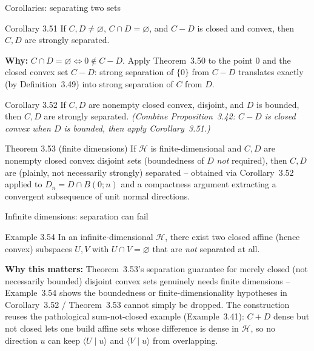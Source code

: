 \documentclass[aspectratio=169,10pt]{beamer}
\newcommand{\Hil}{\mathcal{H}}
\newcommand{\ip}[2]{\langle #1 \mid #2 \rangle}
\begin{document}
\begin{frame}{Corollaries: separating two sets}
  \begin{block}{Corollary 3.51}
    If $C,D\ne\varnothing$, $C\cap D=\varnothing$, and $C-D$ is closed and
    convex, then $C,D$ are strongly separated.
  \end{block}
  \textbf{Why:} $C\cap D=\varnothing \iff 0\notin C-D$. Apply
  Theorem~3.50 to the point $0$ and the closed convex set $C-D$: strong
  separation of $\{0\}$ from $C-D$ translates exactly (by Definition~3.49)
  into strong separation of $C$ from $D$.

  \begin{block}{Corollary 3.52}
    If $C,D$ are nonempty closed convex, disjoint, and $D$ is bounded, then
    $C,D$ are strongly separated. \emph{(Combine Proposition~3.42: $C-D$ is
    closed convex when $D$ is bounded, then apply Corollary~3.51.)}
  \end{block}

  \begin{block}{Theorem 3.53 (finite dimensions)}
    If $\Hil$ is finite-dimensional and $C,D$ are nonempty closed convex
    disjoint sets (boundedness of $D$ \emph{not} required), then $C,D$ are
    (plainly, not necessarily strongly) separated -- obtained via
    Corollary~3.52 applied to $D_n = D\cap B(0;n)$ and a compactness
    argument extracting a convergent subsequence of unit normal directions.
  \end{block}
\end{frame}

\begin{frame}{Infinite dimensions: separation can fail}
  \begin{block}{Example 3.54}
    In an infinite-dimensional $\Hil$, there exist two closed affine
    (hence convex) subspaces $U,V$ with $U\cap V=\varnothing$ that are
    \emph{not} separated at all.
  \end{block}
  \textbf{Why this matters:} Theorem~3.53's separation guarantee for merely
  closed (not necessarily bounded) disjoint convex sets genuinely needs
  finite dimensions -- Example~3.54 shows the boundedness or
  finite-dimensionality hypotheses in Corollary~3.52 / Theorem~3.53 cannot
  simply be dropped. The construction reuses the pathological sum-not-closed
  example (Example~3.41): $C+D$ dense but not closed lets one build affine
  sets whose difference is dense in $\Hil$, so no direction $u$ can keep
  $\ip{U}{u}$ and $\ip{V}{u}$ from overlapping.
\end{frame}
\end{document}
